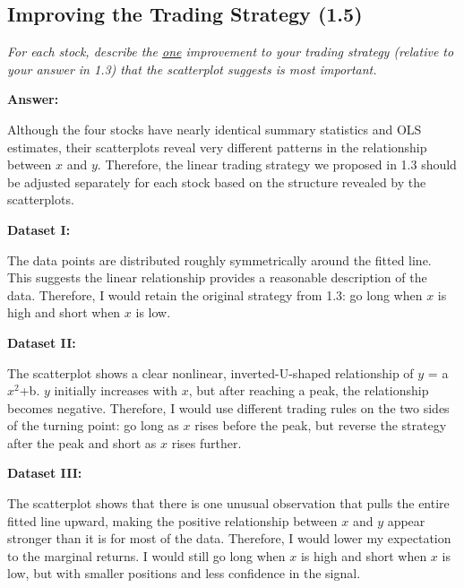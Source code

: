 \documentclass[11pt]{article}
\begin{document}
\subsection{Improving the Trading Strategy (1.5)}

\textit{For each stock, describe the \underline{one} improvement to your
trading strategy (relative to your answer in 1.3) that the scatterplot
suggests is most important.}

\noindent\textbf{Answer:}

Although the four stocks have nearly identical summary statistics and OLS estimates, their scatterplots reveal very different patterns in the relationship between $x$ and $y$. Therefore, the linear trading strategy we proposed in 1.3 should be adjusted separately for each stock based on the structure revealed by the scatterplots.

\vspace{1em}

\noindent\textbf{Dataset I:}

The data points are distributed roughly symmetrically around the fitted line. This suggests the linear relationship provides a reasonable description of the data. Therefore, I would retain the original strategy from 1.3: go long when $x$ is high and short when $x$ is low.

\vspace{1em}

\noindent\textbf{Dataset II:}

The scatterplot shows a clear nonlinear, inverted-U-shaped relationship of $y$ = a$x^2$+b. $y$ initially increases with $x$, but after reaching a peak, the relationship becomes negative. Therefore, I would use different trading rules on the two sides of the turning point: go long as $x$ rises before the peak, but reverse the strategy after the peak and short as $x$ rises further.

\vspace{1em}

\noindent\textbf{Dataset III:}

The scatterplot shows that there is one unusual observation that pulls the entire fitted line upward, making the positive relationship between $x$ and $y$ appear stronger than it is for most of the data. Therefore, I would lower my expectation to the marginal returns. I would still go long when $x$ is high and short when $x$ is low, but with smaller positions and less confidence in the signal.
\end{document}
